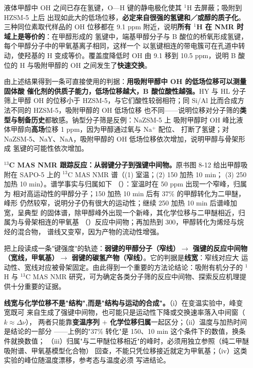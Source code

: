 \begin{infer}
液体甲醇中 OH 之间已存在氢键，O—H 键的静电极化使其 $^{1}$H 去屏蔽；吸附到 HZSM-5 上后
出现如此大的低场位移，\textbf{必定来自很强的氢键和／或醇的质子化}。三种同位素取代样品的
OH 位移都在 9.1 ppm 附近，说明\textbf{所有 $^{1}$H 在 NMR 时域上是等价的}：在甲醇形成的
氢键中，端基甲醇分子与 B 酸位的桥氧形成氢键，每个甲醇分子中的甲氧基离子相同，这样一个
以氢键相连的带电簇可在孔道中转动，使羟基的 H 变成等价。覆盖度降低时 OH 由 9.1 移到
10.5 ppm，说明 B 酸位的 H 与吸附甲醇的 OH 之间发生了\textbf{快速交换}。
\end{infer}

由上述结果得到一条可直接使用的判据：\textbf{用吸附甲醇中 OH 的低场位移可以测量固体酸
催化剂的供质子能力，低场位移越大，B 酸位酸性越强。}HY 与 HL 分子筛上甲醇 OH 的位移小于
HZSM-5，与它们酸性较弱相符；同 Si/Al 比而合成方法不同的 HZSM-5，吸附甲醇的 OH 低场位移
也不同——说明位移对分子筛的\textbf{类型与制备历史}都敏感。钠型分子筛是反例：NaZSM-5 上
吸附甲醇时 OH 峰比液体甲醇向\textbf{高场}位移 1 ppm，因为甲醇通过氧与 Na$^{+}$ 配位、
打断了氢键；对 NaZSM-5、NaY、NaA，吸附甲醇的 OH 低场位移依次增加，说明甲醇与骨架形成
氢键的可能性依次增加。

\textbf{$^{13}$C MAS NMR 跟踪反应：从弱键分子到强键中间物。}原书图 8-12 给出甲醇吸附在
SAPO-5 上的 $^{13}$C MAS NMR 谱（(1) 室温；(2) \qty{150}{\degC} 加热 10 min；
(3) \qty{250}{\degC} 加热 10 min）。谱学事实与归属如下
（）：室温时在 50 ppm 出现一个窄峰，归属为
相对高运动性的甲醇分子；\qty{150}{\degC} 加热 10 min 后有 37\% 的甲醇转化为二甲醚，峰形
仍然较窄，说明分子仍有很大的运动性；继续 \qty{250}{\degC} 加热 10 min 后谱峰加宽，呈典型
的固体谱，除甲醇峰外出现一个新峰，其化学位移与二甲醚相近，归属为与骨架相连的甲氧基
（）反应中间物；再加热到 \qty{300}{\degC}，甲醇转化为烯烃与烷烃的混合物，
谱线又变窄，因为产物的流动性增强。

\begin{dataflow}
把上段读成一条"键强度"的轨迹：\textbf{弱键的甲醇分子（窄线）$\rightarrow$ 强键的反应中间物
（宽线，甲氧基）$\rightarrow$ 弱键的碳氢产物（窄线）}。它的判据是\textbf{线宽}：窄线对应大
运动性、宽线对应被骨架固定。由此得到一个重要的方法论结论：吸附有机分子的 $^{1}$H 与
$^{13}$C MAS NMR 研究，可为确定各类分子筛的反应中间物、探索反应机理提供十分重要的证据。
\end{dataflow}

\begin{pitfall}
\textbf{线宽与化学位移不是"结构",而是"结构与运动的合成"。}（i）在变温实验中，峰变宽既可
来自生成了强键中间物，也可能只是运动性下降或交换速率落入中间窗（$k\approx\Delta\nu$），
两者只能靠\textbf{变温序列 $+$ 化学位移归属}一起区分；（ii）温度与加热时间是结论的一部分
——上例的"37\% 转化"是 \qty{150}{\degC}、10 min 这个条件下的数值，换条件就换数值；
（iii）归属"与二甲醚位移相近"的峰时，必须用独立参照（纯二甲醚吸附谱、甲氧基模型化合物）
回查，不能只凭位移接近就定为甲氧基；（iv）这类实验的峰位随温度漂移，参考态与温度必须
写进结论。
\end{pitfall}

